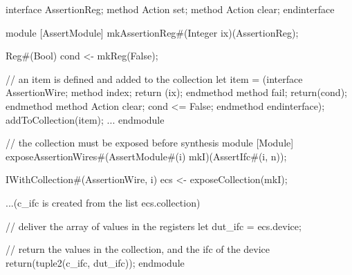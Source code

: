 \begin{libverbatim}
interface AssertionReg;
   method Action set;
   method Action clear;
endinterface

module [AssertModule] mkAssertionReg#(Integer ix)(AssertionReg);

   Reg#(Bool) cond <- mkReg(False);

   // an item is defined and added to the collection
   let item = (interface AssertionWire;
                 method index;
                    return (ix);
                 endmethod
                 method fail;
                    return(cond);
                 endmethod
                 method Action clear;
                     cond <= False;
                 endmethod
               endinterface);
   addToCollection(item);
   ...
endmodule
                     
// the collection must be exposed before synthesis       
module [Module] exposeAssertionWires#(AssertModule#(i) mkI)(AssertIfc#(i, n));
   
   IWithCollection#(AssertionWire, i) ecs <- exposeCollection(mkI);
   
   ...(c_ifc is created from the list ecs.collection)

   // deliver the array of values in the registers
   let dut_ifc = ecs.device;
    
   // return the values in the collection, and the ifc of the device
   return(tuple2(c_ifc, dut_ifc));
endmodule
\end{libverbatim}

